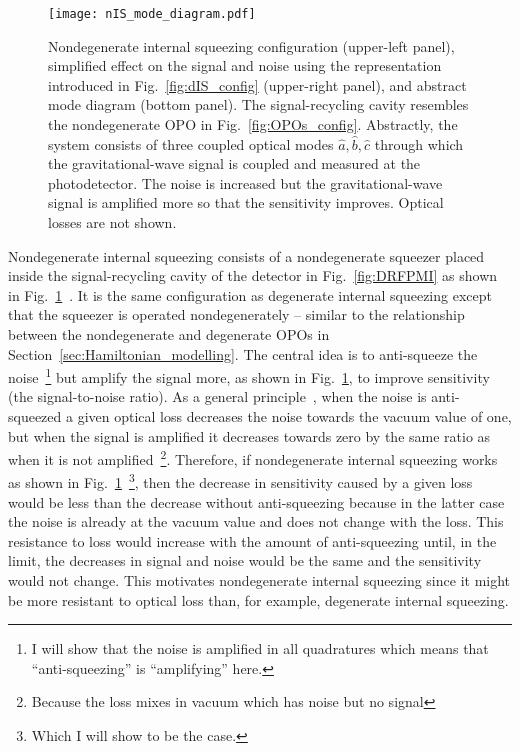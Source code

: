 \begin{figure}[htp]
    \centering
    \texttt{[image: nIS\_mode\_diagram.pdf]}
    \caption{Nondegenerate internal squeezing configuration (upper-left panel), simplified effect on the signal and noise using the representation introduced in Fig.~\ref{fig:dIS_config} (upper-right panel), and abstract mode diagram (bottom panel). The signal-recycling cavity resembles the nondegenerate OPO in Fig.~\ref{fig:OPOs_config}. Abstractly, the system consists of three coupled optical modes $\hat a,\hat b,\hat c$ through which the gravitational-wave signal is coupled and measured at the photodetector. The noise is increased but the gravitational-wave signal is amplified more so that the sensitivity improves. Optical losses are not shown.}
    \label{fig:nIS_mode_diagram}
\end{figure}

Nondegenerate internal squeezing consists of a nondegenerate squeezer placed inside the signal-recycling cavity of the detector in Fig.~\ref{fig:DRFPMI} as shown in Fig.~\ref{fig:nIS_mode_diagram}~\cite{liBroadbandSensitivityImprovement2020}. It is the same configuration as degenerate internal squeezing except that the squeezer is operated nondegenerately -- similar to the relationship between the nondegenerate and degenerate OPOs in Section~\ref{sec:Hamiltonian_modelling}. The central idea is to anti-squeeze the noise~\footnote{I will show that the noise is amplified in all quadratures which means that ``anti-squeezing'' is ``amplifying'' here.} but amplify the signal more, as shown in Fig.~\ref{fig:nIS_mode_diagram}, to improve sensitivity (the signal-to-noise ratio).
As a general principle~\cite{walls_1995}, when the noise is anti-squeezed a given optical loss decreases the noise towards the vacuum value of one, but when the signal is amplified it decreases towards zero by the same ratio as when it is not amplified~\footnote{Because the loss mixes in vacuum which has noise but no signal}. Therefore, if nondegenerate internal squeezing works as shown in Fig.~\ref{fig:nIS_mode_diagram}~\footnote{Which I will show to be the case.}, then the decrease in sensitivity caused by a given loss would be less than the decrease without anti-squeezing because in the latter case the noise is already at the vacuum value and does not change with the loss. This resistance to loss would increase with the amount of anti-squeezing until, in the limit, the decreases in signal and noise would be the same and the sensitivity would not change. %
This motivates nondegenerate internal squeezing since it might be more resistant to optical loss than, for example, degenerate internal squeezing. %

